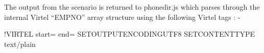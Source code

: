 \documentclass[letterpaper,10pt,english]{sphinxmanual}
\begin{document}
\begin{sphinxVerbatim}[commandchars=\\\{\}]
  
\end{sphinxVerbatim}

The output from the scenario is returned to phonedir.js which parses through the internal Virtel “EMPNO” array structure using the following Virtel tags : -

\begin{sphinxVerbatim}[commandchars=\\\{\}]
 \PYGZob{}\PYGZlt{}!\PYGZhy{}\PYGZhy{}VIRTEL start=\PYGZdq{}\PYGZob{}\PYGZob{}\PYGZob{}\PYGZdq{} end=\PYGZdq{}\PYGZcb{}\PYGZcb{}\PYGZcb{}\PYGZdq{} \PYGZhy{}\PYGZhy{}\PYGZgt{}\PYGZob{}\PYGZob{}\PYGZob{}SET\PYGZhy{}OUTPUT\PYGZhy{}ENCODING\PYGZhy{}UTF\PYGZhy{}8 \PYGZdq{}\PYGZdq{}\PYGZcb{}\PYGZcb{}\PYGZcb{}\PYGZob{}\PYGZob{}\PYGZob{}SET\PYGZhy{}CONTENT\PYGZhy{}TYPE \PYGZdq{}text/plain\PYGZdq{}\PYGZcb{}\PYGZcb{}\PYGZcb{}


\end{sphinxVerbatim}
\end{document}
